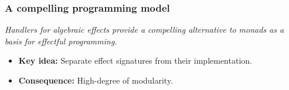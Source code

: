 
\begin{frame}
  \frametitle{A compelling programming model}
  \begin{center}
    \emph{Handlers for algebraic effects provide a compelling alternative to monads as a basis for effectful programming.}
  \end{center}
\begin{itemize}
  \item \textbf{Key idea:} Separate effect signatures from their implementation.
  \item \textbf{Consequence:} High-degree of modularity.
\end{itemize}
\end{frame}

